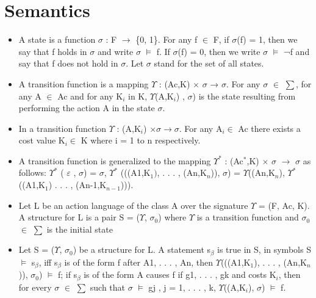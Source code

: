 \documentclass[11pt]{article}
\begin{document}
	\section{Semantics}
	\begin{itemize}
\item 	A state is a function $\sigma$ : F $\rightarrow$ \{0, 1\}. For any f $\in$ F, if $\sigma$(f) = 1, then we say that f holds in $\sigma$ and write $\sigma$   $\vDash$   f. If $\sigma$(f) = 0, then we write $\sigma$   $\vDash$   ¬f and say that f does not hold in $\sigma$. Let $\sigma$ stand for the set of all states.

\item 	A transition function is a mapping $\Upsilon$ : (Ac,K) $\times$ $\sigma$ → $\sigma$. For any $\sigma$ $\in$ $\sum$, for any A $\in$ Ac and for any K$_{i}$ in K, $\Upsilon$(A,K$_{i}$) , $\sigma$) is the state resulting from performing the action A in the state $\sigma$.

\item  In a transition function $\Upsilon$ : (A,K$_{i}$) $\times \sigma \rightarrow \sigma$. For any A$_{i} \in$ Ac there exists a cost value K$_{i} \in$ K  where i = 1 to n respectively. 

\item 	A transition function is generalized to the mapping $\Upsilon^{\ast}$ : (Ac$^{\ast}$,K)  $\times$  $\sigma$ $\rightarrow$ $\sigma$ as follows: 
$\Upsilon^{\ast}$ ( $\varepsilon$ , $\sigma$) = $\sigma$, $\Upsilon^{\ast}$ (((A1,K$_{1})$, . . . , (An,K$_{n}$)), $\sigma$) = $\Upsilon$((An,K$_{n}$), $\Upsilon^{\ast}$ ((A1,K$_{1}$) . . . , (An-1,K$_{n-1}$))).


\item 	Let L be an action language of the class A over the signature $\Upsilon$ = (F, Ac, K). A structure for L is a pair S = ($\Upsilon$, $\sigma_{0}$) where $\Upsilon$ is a transition function and $\sigma_{0}$ $\in$ $\sum$ is the initial state

\item 	Let S = ($\Upsilon$, $\sigma_{0}$) be a structure for L. A statement s$_{\beta}$ is true in S, in symbols S   $\vDash$   s$_{\beta}$, iff s$_{\beta}$ is of the form f after A1, . . . , An, then $\Upsilon$(((A1,K$_{1}$), . . . , (An,K$_{n}$)), $\sigma_{0}$)   $\vDash$   f; if s$_{\beta}$ is of the form A causes f if g1, . . . , gk and costs K$_{i}$, then for every $\sigma$ $\in$ $\sum$ such that $\sigma$   $\vDash$   gj , j = 1, . . . , k, $\Upsilon$((A,K$_{i}$), $\sigma$)   $\vDash$   f.

\end{itemize}
\end{document}
